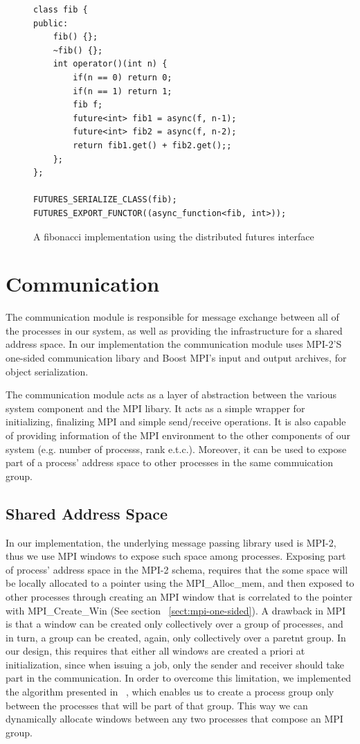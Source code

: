 \begin{figure}[here]
\begin{lstlisting}
class fib {
public:
	fib() {};
	~fib() {};
	int	operator()(int n) {
		if(n == 0) return 0;
		if(n == 1) return 1;
		fib f;
		future<int> fib1 = async(f, n-1);
		future<int> fib2 = async(f, n-2);
		return fib1.get() + fib2.get();;
	};
};

FUTURES_SERIALIZE_CLASS(fib);
FUTURES_EXPORT_FUNCTOR((async_function<fib, int>));

\end{lstlisting}
\caption{A fibonacci implementation using the distributed futures interface}
\label{lst:fib}
\end{figure}



\section{Communication}
\label{sect:communication}
The communication module is responsible for message exchange between all of the processes in our system,
as well as providing the infrastructure for a shared address space.
In our implementation the communication module uses MPI-2'S one-sided communication libary and Boost MPI's
input and output archives, for object serialization.

The communication module acts as a layer of abstraction between the various system component and the MPI libary.
It acts as a simple wrapper for initializing, finalizing MPI and simple send/receive operations.
It is also capable of providing information of the MPI environment to the other components of our system (e.g.
number of processs, rank e.t.c.).  Moreover, it can be used to expose part of a process' address space to other 
processes in the same commuication group.  

\subsection{Shared Address Space}
In our implementation, the underlying message passing library used is MPI-2, thus we use MPI windows to
expose such space among processes.  
Exposing part of process' address space in the MPI-2 schema, requires that the some
space will be locally allocated to a pointer using the MPI\_Alloc\_mem, and then exposed to other processes
through creating an MPI window that is correlated to the pointer with MPI\_Create\_Win 
(See section ~\ref{sect:mpi-one-sided}). 
A drawback in MPI is that a window can be created only collectively over a group of processes,
and in turn, a group can be created, again, only collectively over a paretnt group. 
In our design, this requires that either all windows are created a priori at initialization, 
since when issuing a job, only the sender and receiver should take part in the communication.  
In order to overcome this limitation, we implemented the algorithm presented in 
~\cite{Dinan:2011:NCC:2042476.2042508}, which
enables us to create a process group only between the processes that will be part of that group.  This way we 
can dynamically allocate windows between any two processes that compose an MPI group.

